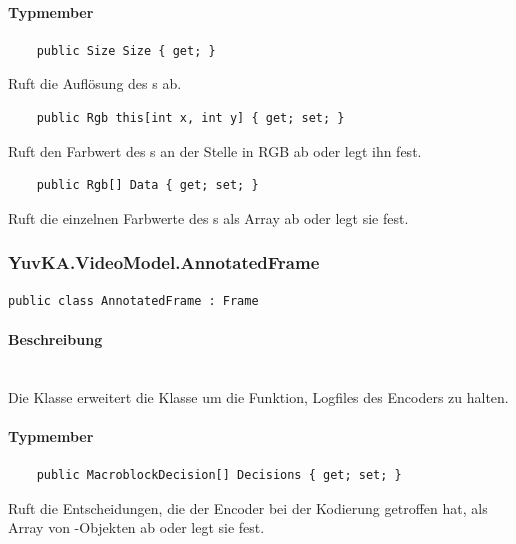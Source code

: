 \paragraph{Typmember}
\begin{itemize}

	\begin{verbatim}
	public Size Size { get; }
	\end{verbatim}
	Ruft die Auflösung des s ab.

	\begin{verbatim}
	public Rgb this[int x, int y] { get; set; }
	\end{verbatim}
	Ruft den Farbwert des s an der Stelle  in RGB ab oder legt ihn fest.

	\begin{verbatim}
	public Rgb[] Data { get; set; }
	\end{verbatim}
	Ruft die einzelnen Farbwerte des s als Array ab oder legt sie fest.

\end{itemize}

\subsubsection{YuvKA.VideoModel.AnnotatedFrame}

\begin{verbatim}
public class AnnotatedFrame : Frame
\end{verbatim}

\paragraph{Beschreibung}~\\
Die Klasse  erweitert die Klasse  um die Funktion, Logfiles des Encoders zu halten.

\paragraph{Typmember}
\begin{itemize}

	\begin{verbatim}
	public MacroblockDecision[] Decisions { get; set; }
	\end{verbatim}
	Ruft die Entscheidungen, die der Encoder bei der Kodierung getroffen hat, als Array von -Objekten ab oder legt sie fest.

\end{itemize}

